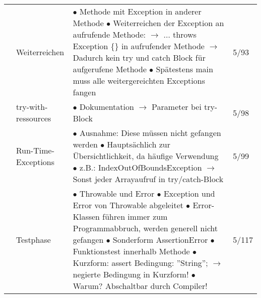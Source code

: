 \documentclass[11pt,a4paper]{article}
\begin{document}
\begin{center}
\begin{longtable}[h]{ | p{2.3cm} | p{2.3cm} | p{12.6cm} | p{1.2cm} | }
	& Weiterreichen & \makecell[l]{$\bullet$ Methode mit Exception in anderer Methode \\ 
	$\bullet$ Weiterreichen der Exception an aufrufende Methode: \\
	\hspace{0.4cm} $\rightarrow$ ... throws Exception \{\} in aufrufender Methode \\ 
	\hspace{0.4cm} $\rightarrow$ Dadurch kein try und catch Block für aufgerufene Methode \\
	$\bullet$ Spätestens main muss alle weitergereichten Exceptions fangen} & 5/93 \\ \cline{2-4}
	
	& try-with-ressources & $\bullet$ Dokumentation $\rightarrow$ Parameter bei try-Block & 5/98 \\ \cline{2-4}
	
	& \makecell[l]{Run-Time-\\Exceptions} & \makecell[l]{ $\bullet$ Ausnahme: Diese müssen nicht gefangen werden \\ 
	$\bullet$ Hauptsächlich zur Übersichtlichkeit, da häufige Verwendung \\
	$\bullet$ z.B.: IndexOutOfBoundsException \\ \hspace{0.4cm} 
	$\rightarrow$ Sonst jeder Arrayaufruf in try/catch-Block } & 5/99 \\ \cline{2-4} 
	
	& Testphase & \makecell[l]{$\bullet$ Throwable und Error  \\ \hspace{0.4cm} $\bullet$ Exception und Error von Throwable abgeleitet \\
	\hspace{0.4cm} $\bullet$ Error-Klassen führen immer zum Programmabbruch, \\ \hspace{0.8cm} werden generell nicht gefangen
	\\ $\bullet$ Sonderform AssertionError \\ \hspace{0.4cm} $\bullet$ Funktionstest innerhalb Methode \\
	\hspace{0.4cm} $\bullet$ Kurzform: assert Bedingung: ''String''; \\ \hspace{0.4cm} $\rightarrow$ negierte Bedingung in Kurzform! \\
	\hspace{0.4cm} $\bullet$ Warum? Abschaltbar durch Compiler!} & 5/117 \\ \cline{2-4}
	

\end{longtable}
\end{center}
\end{document}
